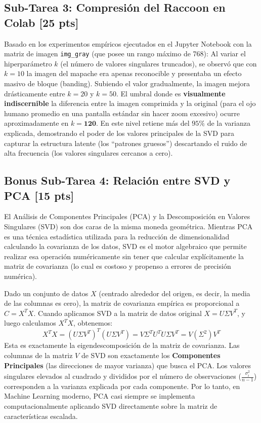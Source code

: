 \documentclass[12pt]{article}
\begin{document}
\subsection*{Sub-Tarea 3: Compresión del Raccoon en Colab [25 pts]}
Basado en los experimentos empíricos ejecutados en el Jupyter Notebook con la matriz de imagen \texttt{img\_gray} (que posee un rango máximo de 768):
Al variar el hiperparámetro $k$ (el número de valores singulares truncados), se observó que con $k=10$ la imagen del mapache era apenas reconocible y presentaba un efecto masivo de bloque (banding). Subiendo el valor gradualmente, la imagen mejora drásticamente entre $k=20$ y $k=50$.
El umbral donde es \textbf{visualmente indiscernible} la diferencia entre la imagen comprimida y la original (para el ojo humano promedio en una pantalla estándar sin hacer zoom excesivo) ocurre aproximadamente en $k = \textbf{120}$. En este nivel retiene más del $95\%$ de la varianza explicada, demostrando el poder de los valores principales de la SVD para capturar la estructura latente (los ``patrones gruesos'') descartando el ruido de alta frecuencia (los valores singulares cercanos a cero).

\subsection*{Bonus Sub-Tarea 4: Relación entre SVD y PCA [15 pts]}
El Análisis de Componentes Principales (PCA) y la Descomposición en Valores Singulares (SVD) son dos caras de la misma moneda geométrica. Mientras PCA es una técnica estadística utilizada para la reducción de dimensionalidad calculando la covarianza de los datos, SVD es el motor algebraico que permite realizar esa operación numéricamente sin tener que calcular explícitamente la matriz de covarianza (lo cual es costoso y propenso a errores de precisión numérica).

Dado un conjunto de datos $X$ (centrado alrededor del origen, es decir, la media de las columnas es cero), la matriz de covarianza empírica es proporcional a $C = X^T X$. 
Cuando aplicamos SVD a la matriz de datos original $X = U \Sigma V^T$, y luego calculamos $X^T X$, obtenemos:
\begin{equation}
    X^T X = (U \Sigma V^T)^T (U \Sigma V^T) = V \Sigma^T U^T U \Sigma V^T = V (\Sigma^2) V^T
\end{equation}
Esta es exactamente la eigendescomposición de la matriz de covarianza. Las columnas de la matriz $V$ de SVD son exactamente los \textbf{Componentes Principales} (las direcciones de mayor varianza) que busca el PCA. Los valores singulares elevados al cuadrado y divididos por el número de observaciones ($ \frac{\sigma_i^2}{n-1} $) corresponden a la varianza explicada por cada componente. 
Por lo tanto, en Machine Learning moderno, PCA casi siempre se implementa computacionalmente aplicando SVD directamente sobre la matriz de características escalada.
\end{document}
